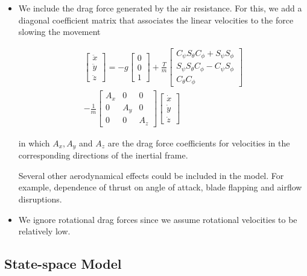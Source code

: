\begin{itemize}

  \item We include the drag force generated by the air resistance. For this, we add a diagonal coefficient matrix that associates the linear velocities to the force slowing the movement

  $$
    \begin{array}{l}
      \left[ \begin{array}{l}{\ddot{x}} \\ {\ddot{y}} \\ {\ddot{z}}\end{array}\right]=-g \left[ \begin{array}{l}{0} \\ {0} \\ {1}\end{array}\right]+\frac{T}{m} \left[ \begin{array}{c}{C_{\psi} S_{\theta} C_{\phi}+S_{\psi} S_{\phi}} \\ {S_{\psi} S_{\theta} C_{\phi}-C_{\psi} S_{\phi}} \\ {C_{\theta} C_{\phi}}\end{array}\right] \\
      - \frac{1}{m} \left[ \begin{array}{ccc}{A_{x}} & {0} & {0} \\ {0} & {A_{y}} & {0} \\ {0} & {0} & {A_{z}}\end{array}\right] \left[ \begin{array}{c}{\dot{x}} \\ {\dot{y}} \\ {\dot{z}}\end{array}\right]
    \end{array}
  $$

  in which $A_{x}, A_{y}$ and $A_{z}$ are the drag force coefficients for velocities in the corresponding directions of the inertial frame.

  Several other aerodynamical effects could be included in the model. For example,
dependence of thrust on angle of attack, blade flapping and airflow disruptions.

  \item We ignore rotational drag forces since we assume rotational velocities to be relatively low.

\end{itemize}

\subsection{State-space Model}

